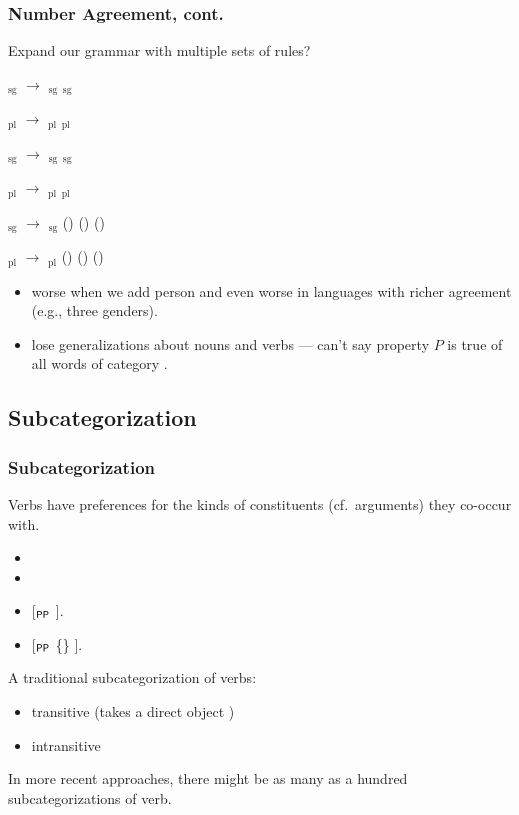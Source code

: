 \begin{frame}[fragile]
\frametitle{Number Agreement, cont.}


Expand our grammar with multiple sets of rules?

\NP$_\text{sg}$ $\rightarrow$ \Det$_\text{sg}$ \N$_\text{sg}$

\NP$_\text{pl}$ $\rightarrow$ \Det$_\text{pl}$ \N$_\text{pl}$

\Se$_\text{sg}$ $\rightarrow$ \NP$_\text{sg}$ \VP$_\text{sg}$

\Se$_\text{pl}$ $\rightarrow$ \NP$_\text{pl}$ \VP$_\text{pl}$

\VP$_\text{sg}$ $\rightarrow$ \V$_\text{sg}$ (\NP) (\NP) (\PP)

\VP$_\text{pl}$ $\rightarrow$ \V$_\text{pl}$ (\NP) (\NP) (\PP)

\begin{itemize}
\item worse when we add person and even worse in languages with richer
  agreement (e.g., three genders).
\item lose generalizations about nouns and verbs --- can't say
  property $P$ is true of all words of category \V.
\end{itemize}
\end{frame}


\subsection{Subcategorization}

\begin{frame}[fragile]
\frametitle{Subcategorization}

Verbs have preferences for the kinds of constituents (cf.\ arguments) they co-occur
with.
\begin{itemize}
\item {}
\item \bad {}
\end{itemize}
\begin{itemize}
\item {} [$_{\textsf{PP}}$ ].
\item \bad {}  [$_{\textsf{PP}}$ \{\} ].
\end{itemize}


A traditional subcategorization of verbs:
\begin{itemize}
\item transitive (takes a direct object \NP)
\item intransitive
\end{itemize}

In more recent approaches, there might be as many as a hundred
subcategorizations of verb.
\end{frame}

